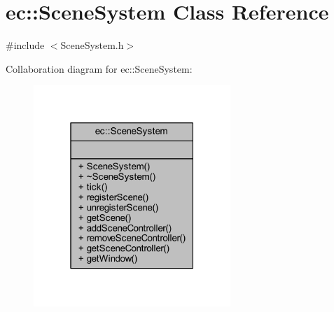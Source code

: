 \hypertarget{classec_1_1_scene_system}{}\section{ec\+:\+:Scene\+System Class Reference}
\label{classec_1_1_scene_system}


{\ttfamily \#include $<$Scene\+System.\+h$>$}



Collaboration diagram for ec\+:\+:Scene\+System\+:\nopagebreak
\begin{figure}[H]
\begin{center}
\leavevmode
\includegraphics[width=211pt]{classec_1_1_scene_system__coll__graph}
\end{center}
\end{figure}
